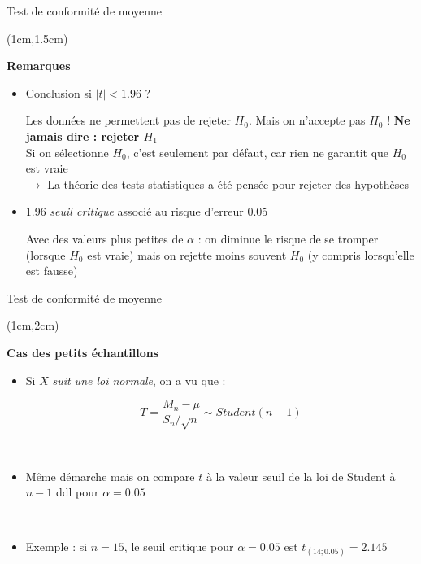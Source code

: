 \documentclass{beamer}
\begin{document}
\begin{frame}{Test de conformité de moyenne }
\begin{textblock*}{\textwidth}(1cm,1.5cm)

\begin{center}{\bf \Large Remarques} \end{center}

\begin{itemize}
\item  Conclusion si $|t| < 1.96$ ?
 
Les données ne permettent pas de rejeter $H_0$. 
Mais on n'accepte pas $H_0$ ! {\bf Ne jamais dire : \og rejeter $H_1$\fg}\\
Si on sélectionne $H_0$, c'est seulement par défaut, car rien ne garantit que $H_0$ est vraie \\
$\rightarrow$ La théorie des tests statistiques a été pensée pour rejeter des hypothèses

\vspace{0.2cm}
\item 1.96 {\it seuil critique} associé au risque d'erreur 0.05

Avec des valeurs plus petites de $\alpha$ : on diminue le risque de se tromper (lorsque $H_0$ est vraie) mais on rejette moins souvent $H_0$ (y compris lorsqu'elle est fausse)

\end{itemize} 

\end{textblock*}
\end{frame}




\begin{frame}{Test de conformité de moyenne }
\begin{textblock*}{\textwidth}(1cm,2cm)

\begin{center}{\bf \Large Cas des petits échantillons} \end{center}

\begin{itemize}
\item Si $X$ {\it suit une loi normale}, on a vu que : 

$$T = \frac{M_n-\mu}{S_n/\sqrt{n}} \sim Student(n-1)$$

\

\item Même démarche mais on compare $t$ à la valeur seuil de la loi de Student à $n-1$ ddl pour $\alpha=0.05$  

\ 

\item Exemple : si $n=15$, le seuil critique pour $\alpha = 0.05$ est $t_{(14;0.05)}=2.145$ 
\end{itemize} 



\end{textblock*}
\end{frame}
\end{document}

